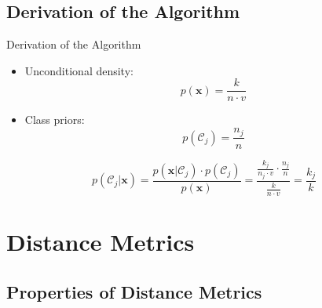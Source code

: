 \subsection{Derivation of the Algorithm}

\begin{frame}{Derivation of the Algorithm}{}\optional
	\begin{itemize}
		\item Unconditional density:
		\begin{equation*}
			p(\bm{x}) = \frac{k}{n \cdot v}
		\end{equation*}
		\item Class priors:
		\begin{equation*}
			p(\mathcal{C}_j) = \frac{n_j}{n}
		\end{equation*}
	\end{itemize}
	
	\begin{boxBlueNoFrame}
		\vspace*{-4mm}
		\begin{equation}
			p(\mathcal{C}_j \vert \bm{x}) 
				= \frac{p(\bm{x} \vert \mathcal{C}_j) \cdot p(\mathcal{C}_j)}{p(\bm{x})}
				= \frac{\frac{k_j}{n_j \cdot v} \cdot \frac{n_j}{n}}{\frac{k}{n \cdot v}}
				= \frac{k_j}{k}
		\end{equation}
	\end{boxBlueNoFrame}
\end{frame}


\section{Distance Metrics}

\subsection{Properties of Distance Metrics}

